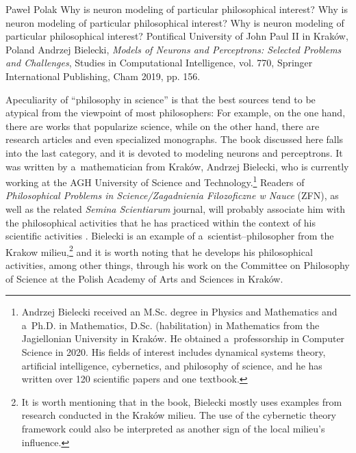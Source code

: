 \begin{newrevengenv}{Paweł Polak}
	{Why is neuron modeling of particular philosophical interest?}
	{Why is neuron modeling of particular philosophical interest?}
	{Why is neuron modeling of particular philosophical interest?}
	{Pontifical University of John Paul II in Kraków, Poland}
	{Andrzej Bielecki, \textit{Models of Neurons and Perceptrons: Selected Problems and Challenges}, Studies in Computational Intelligence, vol. 770, Springer International Publishing, Cham 2019, pp. 156.}
	
	
	
%



\lettrine[loversize=0.13,lines=2,lraise=-0.03,nindent=0em,findent=0.2pt]%
{A}{}peculiarity of ``philosophy in science''
\parencites[see][]{heller_how_2019}[][]{polak_philosophy_2019} %
 is that the best sources tend to be atypical from the viewpoint of most philosophers: For example, on the one hand, there are works that popularize science, while on the other hand, there are research articles and even specialized monographs. The book discussed here falls into the last category, and it is devoted to modeling neurons and perceptrons. It was written by a~mathematician from Kraków, Andrzej Bielecki, who is currently working at the AGH University of Science and Technology.\footnote{Andrzej Bielecki received an M.Sc. degree in Physics and Mathematics and a~Ph.D. in Mathematics, D.Sc. (habilitation) in Mathematics from the Jagiellonian University in Kraków. He obtained a~professorship in Computer Science in 2020. His fields of interest includes dynamical systems theory, artificial intelligence, cybernetics, and philosophy of science, and he has written over 120 scientific papers and one textbook.} Readers of \textit{Philosophical Problems in Science/Zagadnienia Filozoficzne w Nauce} (ZFN), as well as the related \textit{Semina Scientiarum} journal, will probably associate him with the philosophical activities that he has practiced within the context of his scientific activities 
\parencites*[][]{bielecki_cybernetyczna_2016}[][]{bielecki_epistemologiczne_2018}. %
 Bielecki is an example of a~scientist–philosopher from the Krakow milieu,\footnote{It is worth mentioning that in the book, Bielecki mostly uses examples from research conducted in the Kraków milieu. The use of the cybernetic theory framework could also be interpreted as another sign of the local milieu's influence.} and it is worth noting that he develops his philosophical activities, among other things, through his work on the Committee on Philosophy of Science at the Polish Academy of Arts and Sciences in Kraków.


\end{newrevengenv}
